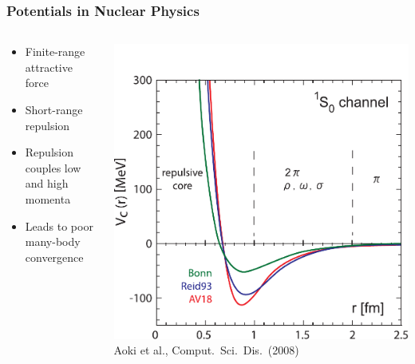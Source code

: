 \documentclass[accentcolor=tud2c,usenames,dvipsnames,colorbacktitle,inverttitle,landscape,german,presentation,t]{tudbeamer}
\begin{document}
  \begin{frame}
    \frametitle{Potentials in Nuclear Physics}
    \begin{columns}[c]
      \begin{column}{0.6\textwidth}
        \begin{itemize}
          \item Finite-range attractive force
          \item Short-range repulsion
          \item Repulsion couples low and high momenta
          \item Leads to poor many-body convergence
        \end{itemize}
      \end{column}
      \begin{column}{0.4\textwidth}
        \begin{center}
          \includegraphics[width=\textwidth]{figures/02/hatsuda_phen-pot_new}
          \\ \small{Aoki et al., Comput.~Sci.~Dis.~(2008)}
        \end{center}
      \end{column}
    \end{columns}
  \end{frame}
\end{document}
